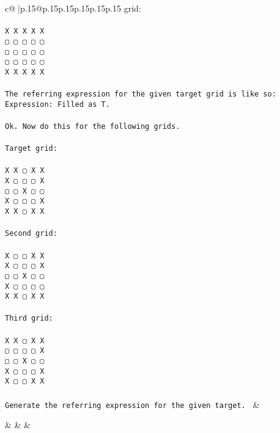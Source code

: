 \documentclass{article}
\begin{document}
{\begin{supertabular}{c@{$\;$}|p{.15\linewidth}@{}p{.15\linewidth}p{.15\linewidth}p{.15\linewidth}p{.15\linewidth}p{.15\linewidth}}
{{{grid:\\ \tt \\ \tt X X X X X\\ \tt ▢ ▢ ▢ ▢ ▢\\ \tt ▢ ▢ ▢ ▢ ▢\\ \tt ▢ ▢ ▢ ▢ ▢\\ \tt X X X X X\\ \tt \\ \tt The referring expression for the given target grid is like so:\\ \tt Expression: Filled as T.\\ \tt \\ \tt Ok. Now do this for the following grids.\\ \tt \\ \tt Target grid:\\ \tt \\ \tt X X ▢ X X\\ \tt X ▢ ▢ ▢ X\\ \tt ▢ ▢ X ▢ ▢\\ \tt X ▢ ▢ ▢ X\\ \tt X X ▢ X X\\ \tt \\ \tt Second grid:\\ \tt \\ \tt X ▢ ▢ X X\\ \tt X ▢ ▢ ▢ X\\ \tt ▢ ▢ X ▢ ▢\\ \tt X ▢ ▢ ▢ ▢\\ \tt X X ▢ X X\\ \tt \\ \tt Third grid:\\ \tt \\ \tt X X ▢ X X\\ \tt ▢ ▢ ▢ ▢ X\\ \tt ▢ ▢ X ▢ ▢\\ \tt X ▢ ▢ ▢ X\\ \tt X ▢ ▢ X X\\ \tt \\ \tt Generate the referring expression for the given target. 
	  } 
	   } 
	   } 
	 & \\ 
 

    \theutterance {}  

    &  
	 & & \\ 
 


\end{supertabular}}
\end{document}

